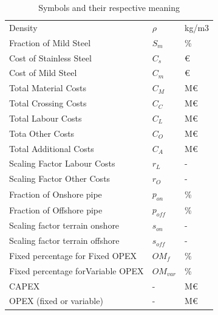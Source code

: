 \documentclass{article}
\begin{document}
\begin{table}[h!]
{\begin{tabular}[t]{@{}lll@{}}
Density & $\rho$ & kg/m3 \\
Fraction of Mild Steel &$ S_m $& \%\\
Cost of Stainless Steel &$ C_s $& \euro{} \\
Cost of Mild Steel &$ C_m$ & \euro{}\\
Total Material Costs &$C_M$ & M\euro{}\\
Total Crossing Costs &$C_C$ & M\euro{}\\
Total Labour Costs &$C_L$ & M\euro{}\\
Tota Other Costs &$C_O$ & M\euro{}\\
Total Additional Costs &$C_A$ & M\euro{}\\
Scaling Factor Labour Costs & $r_L$ & - \\
Scaling Factor Other Costs & $r_O$ & - \\
Fraction of Onshore pipe &$p_{on}$& \% \\
Fraction of Offshore pipe &$p_{off}$& \%\\
Scaling factor terrain onshore &$s_{on}$& - \\
Scaling factor terrain offshore &$s_{off}$& - \\
Fixed percentage for Fixed OPEX &$OM_f$& \%\\
Fixed percentage forVariable OPEX &$OM_{var}$& \%\\
CAPEX& - & M€\\
OPEX (fixed or variable)& - & M€\\
\end{tabular}
}
\caption{Symbols and their respective meaning}
\label{table:Symbols}
\end{table}
\end{document}
